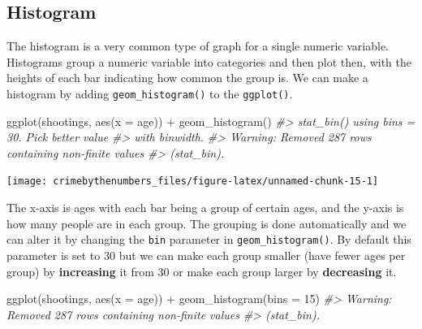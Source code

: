 \documentclass[
  12pt,
  openany]{book}
\newenvironment{Shaded}{\begin{snugshade}}{\end{snugshade}}
\newcommand{\AttributeTok}[1]{\textcolor[rgb]{0.61,0.61,0.61}{#1}}
\newcommand{\CommentTok}[1]{\textcolor[rgb]{0.37,0.37,0.37}{\textit{#1}}}
\newcommand{\DecValTok}[1]{\textcolor[rgb]{0.06,0.06,0.06}{#1}}
\newcommand{\FunctionTok}[1]{\textcolor[rgb]{0,0,0}{#1}}
\newcommand{\NormalTok}[1]{#1}
\newcommand{\SpecialCharTok}[1]{\textcolor[rgb]{0,0,0}{#1}}
\begin{document}
\hypertarget{histogram}{%
\subsection{Histogram}\label{histogram}}

The histogram is a very common type of graph for a single numeric variable. Histograms group a numeric variable into categories and then plot then, with the heights of each bar indicating how common the group is. We can make a histogram by adding \texttt{geom\_histogram()} to the \texttt{ggplot()}.

\begin{Shaded}
\begin{Highlighting}[]
\FunctionTok{ggplot}\NormalTok{(shootings, }\FunctionTok{aes}\NormalTok{(}\AttributeTok{x =}\NormalTok{ age)) }\SpecialCharTok{+} 
  \FunctionTok{geom\_histogram}\NormalTok{()}
\CommentTok{\#\textgreater{} \textasciigrave{}stat\_bin()\textasciigrave{} using \textasciigrave{}bins = 30\textasciigrave{}. Pick better value}
\CommentTok{\#\textgreater{} with \textasciigrave{}binwidth\textasciigrave{}.}
\CommentTok{\#\textgreater{} Warning: Removed 287 rows containing non{-}finite values}
\CommentTok{\#\textgreater{} (stat\_bin).}
\end{Highlighting}
\end{Shaded}

\begin{center}\texttt{[image: crimebythenumbers\_files/figure-latex/unnamed-chunk-15-1]} \end{center}

The x-axis is ages with each bar being a group of certain ages, and the y-axis is how many people are in each group. The grouping is done automatically and we can alter it by changing the \texttt{bin} parameter in \texttt{geom\_histogram()}. By default this parameter is set to 30 but we can make each group smaller (have fewer ages per group) by \textbf{increasing} it from 30 or make each group larger by \textbf{decreasing} it.

\begin{Shaded}
\begin{Highlighting}[]
\FunctionTok{ggplot}\NormalTok{(shootings, }\FunctionTok{aes}\NormalTok{(}\AttributeTok{x =}\NormalTok{ age)) }\SpecialCharTok{+} 
  \FunctionTok{geom\_histogram}\NormalTok{(}\AttributeTok{bins =} \DecValTok{15}\NormalTok{)}
\CommentTok{\#\textgreater{} Warning: Removed 287 rows containing non{-}finite values}
\CommentTok{\#\textgreater{} (stat\_bin).}
\end{Highlighting}
\end{Shaded}
\end{document}
